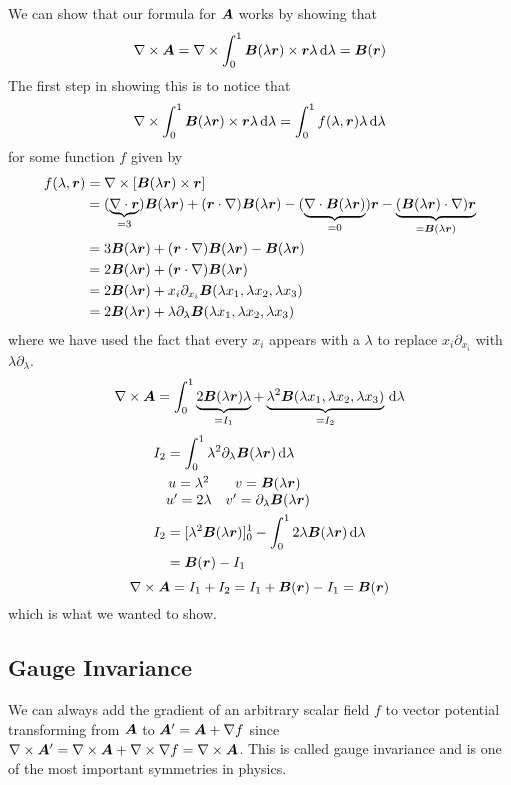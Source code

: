\documentclass{article}
\newcommand{\pdvx}[1]{\partial_{x_{#1}}}
\begin{document}
    We can show that our formula for \(\bm{A}\) works by showing that
    \[\nabla\times\bm{A} = \nabla\times\int_0^1\bm{B}(\lambda\bm{r})\times\bm{r}\lambda\,\dd\lambda = \bm{B}(\bm{r})\]
    The first step in showing this is to notice that
    \[\nabla\times\int_0^1\bm{B}(\lambda\bm{r})\times\bm{r}\lambda\,\dd\lambda = \int_0^1 f(\lambda, \bm{r})\lambda\,\dd\lambda\]
    for some function \(f\) given by
    \begin{align*}
        f(\lambda, \vv r) &= \curl[\vv B(\lambda\vv r)\times\vv r]\\
        &= (\underbrace{\div\vv r}_{= 3})\vv B(\lambda\vv r) + (\vv r\cdot\grad)\vv B(\lambda\vv r) - (\underbrace{\div\vv B(\lambda\vv r)}_{=0})\vv r - \underbrace{(\vv B(\lambda\vv r)\cdot\grad)\vv r}_{=\vv B(\lambda\vv r)}\\
        &= 3\vv B(\lambda\vv r) + (\vv r\cdot\grad)\vv B(\lambda\vv r) - \vv B(\lambda\vv r)\\
        &= 2\vv B(\lambda\vv r) + (\vv r\cdot\grad)\vv B(\lambda\vv r)\\
        &= 2\vv B(\lambda\vv r) + x_i\pdvx i\vv B(\lambda x_1, \lambda x_2, \lambda x_3)\\
        &= 2\vv B(\lambda\vv r) + \lambda\partial_\lambda\vv B(\lambda x_1, \lambda x_2, \lambda x_3)
    \end{align*}
    where we have used the fact that every \(x_i\) appears with a \(\lambda\) to replace \(x_i\pdvx i\) with \(\lambda\partial_\lambda\).
    \[\nabla\times\bm{A} = \int_0^1 \underbrace{2\bm{B}(\lambda\bm{r})\lambda}_{=I_1} + \underbrace{\lambda^2\bm{B}(\lambda x_1, \lambda x_2, \lambda x_3)}_{=I_2}\,\dd\lambda\]
    \begin{align*}
        I_2 &= \int_0^1 \lambda^2\partial_\lambda\bm{B}(\lambda\bm{r})\,\dd\lambda\\
        &
        \begin{matrix}
        u = \lambda^2 & v = \bm{B}(\lambda\bm{r})\\
        u' = 2\lambda & v' = \partial_\lambda\bm{B}(\lambda\bm{r})
        \end{matrix}
        \\
        I_2 &= [\lambda^2\bm{B}(\lambda\bm{r})]_0^1 - \int_0^1 2\lambda\bm{B}(\lambda\bm{r})\,\dd\lambda\\
        &= \bm{B}(\bm{r}) - I_1
    \end{align*}
    \[\nabla\times\bm{A} = I_1 + I_2 = I_1 + \bm{B}(\bm{r}) - I_1 = \bm{B}(\bm{r})\]
    which is what we wanted to show.
    
    \subsection{Gauge Invariance}
    We can always add the gradient of an arbitrary scalar field \(f\) to vector potential transforming from \(\bm{A}\) to \(\bm{A}' = \bm{A} + \nabla f\) since \(\nabla\times\bm{A}' = \nabla\times\bm{A} + \nabla\times\nabla f = \nabla\times\bm{A}\).
    This is called gauge invariance and is one of the most important symmetries in physics.
    
\end{document}
